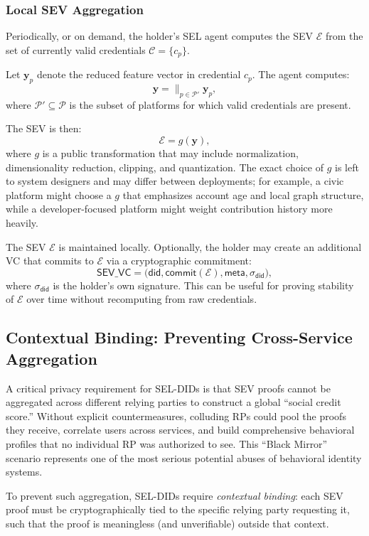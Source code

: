\documentclass[11pt]{article}
\newcommand{\bigparallel}{\mathop{\|}}
\begin{document}
\subsubsection{Local SEV Aggregation}

Periodically, or on demand, the holder's SEL agent computes the SEV $\mathcal{E}$ from the set of currently valid credentials $\mathcal{C} = \{c_p\}$.

Let $\mathbf{y}_p$ denote the reduced feature vector in credential $c_p$. The agent computes:
\[
  \mathbf{y} = \bigparallel_{p \in \mathcal{P}'} \mathbf{y}_p,
\]
where $\mathcal{P}' \subseteq \mathcal{P}$ is the subset of platforms for which valid credentials are present.

The SEV is then:
\[
  \mathcal{E} = g(\mathbf{y}),
\]
where $g$ is a public transformation that may include normalization, dimensionality reduction, clipping, and quantization. The exact choice of $g$ is left to system designers and may differ between deployments; for example, a civic platform might choose a $g$ that emphasizes account age and local graph structure, while a developer-focused platform might weight contribution history more heavily.

The SEV $\mathcal{E}$ is maintained locally. Optionally, the holder may create an additional VC that commits to $\mathcal{E}$ via a cryptographic commitment:
\[
  \textsf{SEV\_VC} = \big( \mathsf{did}, \textsf{commit}(\mathcal{E}), \textsf{meta}, \sigma_{\mathsf{did}} \big),
\]
where $\sigma_{\mathsf{did}}$ is the holder's own signature. This can be useful for proving stability of $\mathcal{E}$ over time without recomputing from raw credentials.

\subsection{Contextual Binding: Preventing Cross-Service Aggregation}
\label{sec:contextual_binding}

A critical privacy requirement for SEL-DIDs is that SEV proofs cannot be aggregated across different relying parties to construct a global ``social credit score.'' Without explicit countermeasures, colluding RPs could pool the proofs they receive, correlate users across services, and build comprehensive behavioral profiles that no individual RP was authorized to see. This ``Black Mirror'' scenario represents one of the most serious potential abuses of behavioral identity systems.

To prevent such aggregation, SEL-DIDs require \emph{contextual binding}: each SEV proof must be cryptographically tied to the specific relying party requesting it, such that the proof is meaningless (and unverifiable) outside that context.
\end{document}
